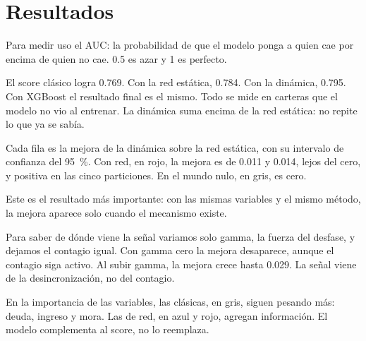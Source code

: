 \section{Resultados}

\begin{decir}
Para medir uso el AUC: la probabilidad de que el modelo ponga a quien cae por encima de
quien no cae. 0.5 es azar y 1 es perfecto.

El score clásico logra 0.769. Con la red estática, 0.784. Con la dinámica, 0.795. Con
XGBoost el resultado final es el mismo. Todo se mide en carteras que el modelo no vio al
entrenar. La dinámica suma encima de la red estática: no repite lo que ya se sabía.
\end{decir}

\begin{decir}
Cada fila es la mejora de la dinámica sobre la red estática, con su intervalo de
confianza del 95~\%. Con red, en rojo, la mejora es de 0.011 y 0.014, lejos del cero, y
positiva en las cinco particiones. En el mundo nulo, en gris, es cero.

Este es el resultado más importante: con las mismas variables y el mismo método, la
mejora aparece solo cuando el mecanismo existe.
\end{decir}

\begin{decir}
Para saber de dónde viene la señal variamos solo gamma, la fuerza del desfase, y dejamos
el contagio igual. Con gamma cero la mejora desaparece, aunque el contagio siga activo.
Al subir gamma, la mejora crece hasta 0.029. La señal viene de la desincronización, no
del contagio.
\end{decir}

\begin{decir}
En la importancia de las variables, las clásicas, en gris, siguen pesando más: deuda,
ingreso y mora. Las de red, en azul y rojo, agregan información. El modelo complementa al
score, no lo reemplaza.
\end{decir}

